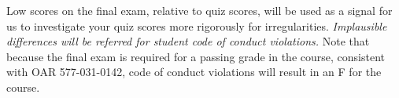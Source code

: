 \documentclass[letterpaper,10pt]{article}
\begin{document}
Low scores on the final exam, relative to quiz scores, will be used as a signal for us to investigate your quiz scores more rigorously for irregularities.  \emph{Implausible differences will be referred for student code of conduct violations.}  Note that because the final exam is required for a passing grade in the course, consistent with OAR 577-031-0142, code of conduct violations will result in an F for the course.





% 
% 
% 
% 
% 
% 
% 
% 
\end{document}

